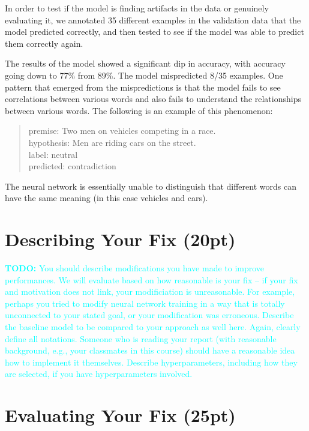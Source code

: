 \documentclass[twocolumn]{article}
\newcommand{\todo}[1]{\textcolor{cyan}{\textbf{TODO:} #1}}
\begin{document}
In order to test if the model is finding artifacts in the data or genuinely
evaluating it, we annotated 35 different examples in the validation data that
the model predicted correctly, and then tested to see if the model was able to
predict them correctly again.

The results of the model showed a significant dip in accuracy, with accuracy
going down to 77\% from 89\%. The model mispredicted 8/35 examples. One pattern
that emerged from the mispredictions is that the model fails to see correlations
between various words and also fails to understand the relationships between
various words. The following is an example of this phenomenon: \\

\begin{quote}
premise: Two men on vehicles competing in a race. \\
hypothesis: Men are riding cars on the street. \\
label: neutral \\
predicted: contradiction
\end{quote}

The neural network is essentially unable to distinguish that different words can
have the same meaning (in this case vehicles and cars).

\section{Describing Your Fix (20pt)}


\todo{You should describe modifications you have made to improve performances.
We will evaluate based on how reasonable is your fix  -- if your fix and
motivation does not link, your modificiation is unreasonable. For example,
perhaps you tried to modify neural network training in a way that is totally
unconnected to your stated goal, or your modification was erroneous. Describe
the baseline model to be compared to your approach as well here. Again, clearly
define all notations. Someone who is reading your report (with reasonable
background, e.g., your classmates in this course) should have a reasonable idea
how to implement it themselves. Describe hyperparameters, including how they
are selected, if you have hyperparameters involved. }

\section{Evaluating Your Fix (25pt)}
\end{document}
